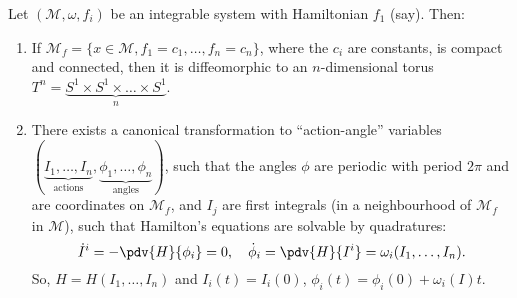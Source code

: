 \documentclass{jknotes}
\begin{document}
\begin{theorem}
    Let \((\mathcal{M},\omega,f_i)\) be an integrable system with Hamiltonian \(f_1\) (say). Then:
    \begin{enumerate}
        \item If \(\mathcal{M}_f = \{x\in\mathcal{M}, f_1=c_1, \dots, f_n=c_n\}\), where the \(c_i\) are constants, is compact and connected, then it is diffeomorphic to an \(n\)-dimensional torus \(T^n=\underbrace{S^1\times S^1\times\dots\times S^1}_n\).
        \item There exists a canonical transformation to ``action-angle'' variables \((\underbrace{I_1,\dots,I_n}_{\text{actions}},\underbrace{\phi_1,\dots,\phi_n}_{\text{angles}})\), such that the angles \(\phi\) are periodic with period \(2\pi\) and are coordinates on \(\mathcal{M}_f\), and \(I_j\) are first integrals (in a neighbourhood of \(\mathcal{M}_f\) in \(\mathcal{M}\)), such that Hamilton's equations are solvable by quadratures:
            \begin{equation}
                \dot{I}^i = -\pdv{H}{\phi_i} = 0,\quad \dot{\phi}_i = \pdv{H}{I^i} = \omega_i(I_1,\dots,I_n).
            \end{equation}
            So, \(H=H(I_1,\dots,I_n)\) and \(I_i(t)=I_i(0)\), \(\phi_i(t) = \phi_i(0) + \omega_i(I)t\).
    \end{enumerate}
\end{theorem}
\end{document}
